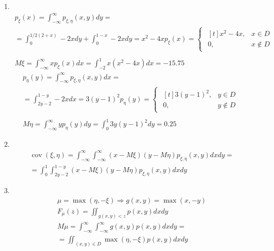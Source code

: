 \documentclass[12pt]{article}
\DeclareMathOperator{\cov}{cov}
\begin{document}
\begin{enumerate}
	\item \mbox{}\\
	      \begin{gather*}
		      p_{\xi}(x) = \int_{-\infty}^{\infty}p_{\xi,\eta}(x,y)dy = \\
		      = \int_{0}^{1/2(2+x)}-2xdy + \int_{0}^{1-x}-2xdy = x^2 - 4x
		      p_{\xi}(x) =
		      \begin{cases}
			      \begin{aligned}[t]
				      x^2-4x, & x \in D    \\
				      0,      & x \notin D
			      \end{aligned}
		      \end{cases} \\\\
		      M\xi = \int_{-\infty}^{\infty}xp_{\xi}(x)dx = \int_{-2}^{1}x(x^2 - 4x)dx = -15.75
	      \end{gather*}
	      \begin{gather*}
		      p_{\eta}(y) = \int_{-\infty}^{\infty}p_{\xi,\eta}(x,y)dx = \\
		      = \int_{2y - 2}^{1 - y}-2xdx = 3(y - 1)^2
		      p_{\eta}(y) =
		      \begin{cases}
			      \begin{aligned}[t]
				      3(y - 1)^2, & y \in D    \\
				      0,          & y \notin D
			      \end{aligned}
		      \end{cases} \\\\
		      M\eta = \int_{-\infty}^{\infty}yp_{\eta}(y)dy = \int_{0}^{1}3y(y - 1)^2dy = 0.25
	      \end{gather*}

	\item \mbox{}\\
	      \begin{gather*}
		      \cov(\xi, \eta) = \int_{-\infty}^{\infty}\int_{-\infty}^{\infty}(x - M\xi)(y - M\eta)p_{\xi,\eta}(x,y)dxdy = \\
		      = \int_{0}^{1}\int_{2y-2}^{1-y}(x - M\xi)(y - M\eta)p_{\xi,\eta}(x,y)dxdy
	      \end{gather*}

	\item \mbox{}\\
	      \begin{gather*}
		      \mu = \max(\eta, -\xi) \Rightarrow g(x, y) = \max(x, -y) \\
		      F_{\mu}(z) = \iint_{g(x, y) < z} p(x,y)dxdy \\
		      M\mu = \int_{-\infty}^{\infty}\int_{-\infty}^{\infty}g(x,y)p(x,y)dxdy = \\
		      = \iint_{(x,y) \in D}\max(\eta,-\xi)p(x,y)dxdy \\ %
	      \end{gather*}

\end{enumerate}
\end{document}
